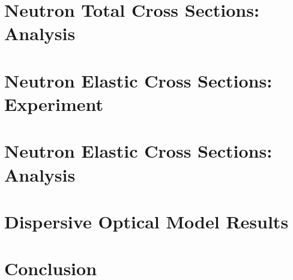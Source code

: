 \documentclass[twosided, 12pt]{book} %
\begin{document}
\chapter{Neutron Total Cross Sections: Analysis} \label{TCSAnalysis}


\chapter{Neutron Elastic Cross Sections: Experiment} \label{ECSExperiment}


\chapter{Neutron Elastic Cross Sections: Analysis} \label{ECSAnalysis}


\chapter{Dispersive Optical Model Results}\label{DOMResults}


\chapter{Conclusion}


\clearpage %

\fancyhead{} %
\fancyhead[LE]{\MakeUppercase{ \leftmark}} %

\clearpage
{}

\singlespacing


\doublespacing

\clearpage
\end{document}
